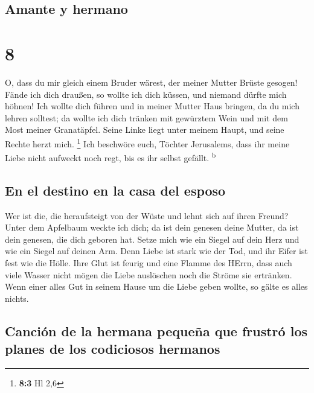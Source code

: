 \hypertarget{amante-y-hermano}{%
\subsection{Amante y hermano}\label{amante-y-hermano}}

\hypertarget{section-7}{%
\section{8}\label{section-7}}

 O, dass du mir gleich einem Bruder wärest, der meiner
Mutter Brüste gesogen! Fände ich dich draußen, so wollte ich dich
küssen, und niemand dürfte mich höhnen!  Ich wollte dich
führen und in meiner Mutter Haus bringen, da du mich lehren solltest; da
wollte ich dich tränken mit gewürztem Wein und mit dem Most meiner
Granatäpfel.  Seine Linke liegt unter meinem Haupt, und
seine Rechte herzt mich. \footnote{\textbf{8:3} Hl 2,6} 
Ich beschwöre euch, Töchter Jerusalems, dass ihr meine Liebe nicht
aufweckt noch regt, bis es ihr selbst gefällt. \textsuperscript{b}

\hypertarget{en-el-destino-en-la-casa-del-esposo}{%
\subsection{En el destino en la casa del
esposo}\label{en-el-destino-en-la-casa-del-esposo}}

 Wer ist die, die heraufsteigt von der Wüste und lehnt
sich auf ihren Freund? Unter dem Apfelbaum weckte ich dich; da ist dein
genesen deine Mutter, da ist dein genesen, die dich geboren hat.
 Setze mich wie ein Siegel auf dein Herz und wie ein
Siegel auf deinen Arm. Denn Liebe ist stark wie der Tod, und ihr Eifer
ist fest wie die Hölle. Ihre Glut ist feurig und eine Flamme des HErrn,
 dass auch viele Wasser nicht mögen die Liebe auslöschen
noch die Ströme sie ertränken. Wenn einer alles Gut in seinem Hause um
die Liebe geben wollte, so gälte es alles nichts.

\hypertarget{canciuxf3n-de-la-hermana-pequeuxf1a-que-frustruxf3-los-planes-de-los-codiciosos-hermanos}{%
\subsection{Canción de la hermana pequeña que frustró los planes de los
codiciosos
hermanos}\label{canciuxf3n-de-la-hermana-pequeuxf1a-que-frustruxf3-los-planes-de-los-codiciosos-hermanos}}

